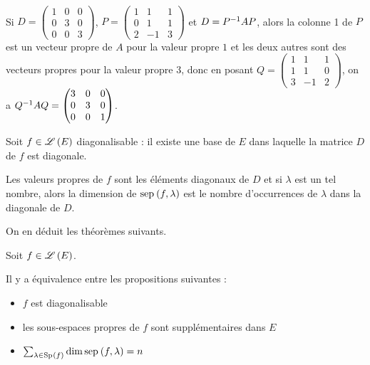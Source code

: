 \begin{ex}~\\
Si \(D=\begin{pmatrix}
1 & 0 & 0 \\
0 & 3 & 0 \\
0 & 0 & 3
\end{pmatrix}\), \(P=\begin{pmatrix}
1 & 1 & 1 \\
0 & 1 & 1 \\
2 & -1 & 3
\end{pmatrix}\) et \(D=P^{-1} AP\), alors la colonne 1 de \(P\) est un vecteur propre de \(A\) pour la valeur propre \(1\) et les deux autres sont des vecteurs propres pour la valeur propre \(3\), donc en posant \(Q=\begin{pmatrix}
1 & 1 & 1 \\
1 & 1 & 0 \\
3 & -1 & 2
\end{pmatrix}\), on a \(Q^{-1} AQ=\begin{pmatrix}
3 & 0 & 0 \\
0 & 3 & 0 \\
0 & 0 & 1
\end{pmatrix}\).
\end{ex}

\begin{lem}
Soit \(f\in\mathscr{L}\left(E\right)\) diagonalisable : il existe une base de \(E\) dans laquelle la matrice \(D\) de \(f\) est diagonale.

Les valeurs propres de \(f\) sont les éléments diagonaux de \(D\) et si \(\lambda\) est un tel nombre, alors la dimension de \(\sep{f}{\lambda}\) est le nombre d'occurrences de \(\lambda\) dans la diagonale de \(D\).
\end{lem}

On en déduit les théorèmes suivants.

\begin{theo}
Soit \(f\in\mathscr{L}\left(E\right)\).

Il y a équivalence entre les propositions suivantes :

\begin{itemize}
    \item \(f\) est diagonalisable \\
    \item les sous-espaces propres de \(f\) sont supplémentaires dans \(E\) \\
    \item \(\sum_{\lambda\in\Sp{f}}\dim\sep{f}{\lambda}=n\)
\end{itemize}
\end{theo}

